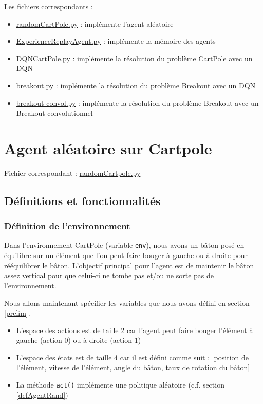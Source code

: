 \documentclass[10pt,a4paper]{article}
\begin{document}
Les fichiers correspondants :
\begin{itemize}
	\item \href{https://github.com/NellyBarret/IA5-TP-APR/blob/nelly/randomCartPole.py}{randomCartPole.py} : implémente l'agent aléatoire
	\item \href{https://github.com/NellyBarret/IA5-TP-APR/blob/nelly/ExperienceReplayAgent.py}{ExperienceReplayAgent.py} : implémente la mémoire des agents
	\item \href{https://github.com/NellyBarret/IA5-TP-APR/blob/nelly/DQNCartPole.py}{DQNCartPole.py} : implémente la résolution du problème CartPole avec un DQN
	\item \href{https://github.com/NellyBarret/IA5-TP-APR/blob/nelly/breakout.py}{breakout.py} : implémente la résolution du problème Breakout avec un DQN
	\item \href{https://github.com/NellyBarret/IA5-TP-APR/blob/nelly/breakout-convol.py}{breakout-convol.py} : implémente la résolution du problème Breakout avec un Breakout convolutionnel
\end{itemize}


\section{Agent aléatoire sur Cartpole}

Fichier correspondant : \href{https://github.com/NellyBarret/IA5-TP-APR/blob/master/randomCartPole.py}{randomCartpole.py}

\subsection{Définitions et fonctionnalités}
\subsubsection{Définition de l'environnement}
Dans l'environnement CartPole (variable \lstinline{env}), nous avons un bâton posé en équilibre sur un élément que l'on peut faire bouger à gauche ou à droite pour rééquilibrer le bâton. L'objectif principal pour l'agent est de maintenir le bâton assez vertical pour que celui-ci ne tombe pas et/ou ne sorte pas de l'environnement.

Nous allons maintenant spécifier les variables que nous avons défini en section \ref{prelim}.
\begin{itemize}
	\item L'espace des actions est de taille 2 car l'agent peut faire bouger l'élément à gauche (action 0) ou à droite (action 1)
	\item L'espace des états est de taille 4 car il est défini comme suit : [position de l'élément, vitesse de l'élément, angle du bâton, taux de rotation du bâton]
	\item La méthode \lstinline{act()} implémente une politique aléatoire (c.f. section \ref{defAgentRand})
\end{itemize}
\end{document}
